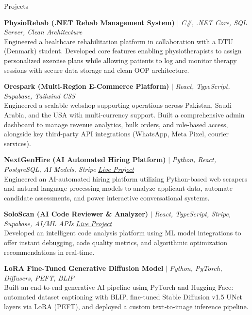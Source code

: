 \documentclass{resume} %
\begin{document}

\begin{rSection}{Projects}
\vspace{-1.25em}

\item \textbf{PhysioRehab (.NET Rehab Management System)} $|$ \textit{C\#, .NET Core, SQL Server, Clean Architecture} \hfill \textit{}\\
{Engineered a healthcare rehabilitation platform in collaboration with a DTU (Denmark) student. Developed core features enabling physiotherapists to assign personalized exercise plans while allowing patients to log and monitor therapy sessions with secure data storage and clean OOP architecture.}

\item \textbf{Orespark (Multi-Region E-Commerce Platform)} $|$ \textit{React, TypeScript, Supabase, Tailwind CSS} \hfill \textit{}\\
{Engineered a scalable webshop supporting operations across Pakistan, Saudi Arabia, and the USA with multi-currency support. Built a comprehensive admin dashboard to manage revenue analytics, bulk orders, and role-based access, alongside key third-party API integrations (WhatsApp, Meta Pixel, courier services).}

\item \textbf{NextGenHire (AI Automated Hiring Platform)} $|$ \textit{Python, React, PostgreSQL, AI Models, Stripe} \hfill \textit{\href{https://nextgennhire.vercel.app/}{Live Project}}\\
{Engineered an AI-automated hiring platform utilizing Python-based web scrapers and natural language processing models to analyze applicant data, automate candidate assessments, and power interactive conversational systems.}

\item \textbf{SoloScan (AI Code Reviewer \& Analyzer)} $|$ \textit{React, TypeScript, Stripe, Supabase, AI/ML APIs} \hfill \textit{\href{https://soloscan.vercel.app/}{Live Project}}\\
{Developed an intelligent code analysis platform using ML model integrations to offer instant debugging, code quality metrics, and algorithmic optimization recommendations in real-time.}

\item \textbf{LoRA Fine-Tuned Generative Diffusion Model} $|$ \textit{Python, PyTorch, Diffusers, PEFT, BLIP} \hfill \textit{}\\
{Built an end-to-end generative AI pipeline using PyTorch and Hugging Face: automated dataset captioning with BLIP, fine-tuned Stable Diffusion v1.5 UNet layers via LoRA (PEFT), and deployed a custom text-to-image inference pipeline.}

\end{rSection}
\end{document}
